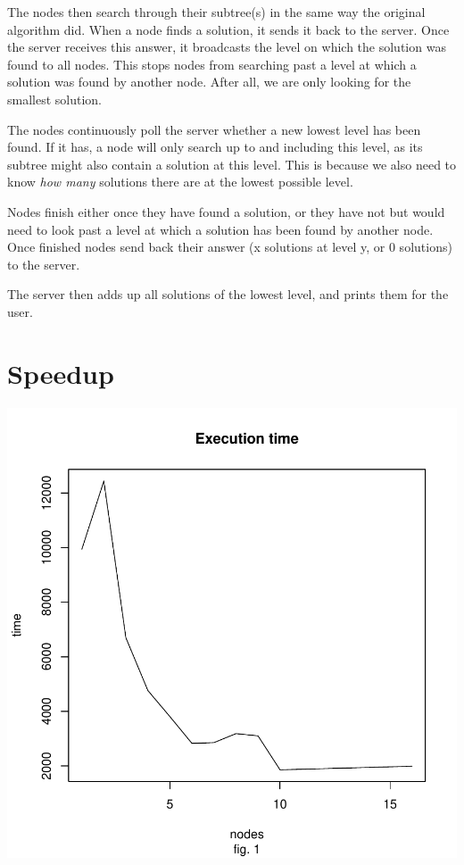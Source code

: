 \documentclass[a4paper,11pt]{article}
\begin{document}
The nodes then search through their subtree(s) in the same way the original algorithm did. When a node finds a solution, it sends it back to the server. Once the server receives this answer, it broadcasts the level on which the solution was found to all nodes. This stops nodes from searching past a level at which a solution was found by another node. After all, we are only looking for the smallest solution. 

The nodes continuously poll the server whether a new lowest level has been found. If it has, a node will only search up to and including this level, as its subtree might also contain a solution at this level. This is because we also need to know \emph{how many} solutions there are at the lowest possible level. 

Nodes finish either once they have found a solution, or they have not but would need to look past a level at which a solution has been found by another node. Once finished nodes send back their answer (x solutions at level y, or 0 solutions) to the server.

The server then adds up all solutions of the lowest level, and prints them for the user. 

\section{Speedup}

\noindent

\includegraphics{report-001}
\end{document}
